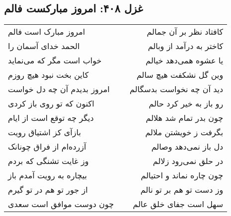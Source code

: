 \begin{center}
\section*{غزل ۴۰۸: امروز مبارکست فالم}
\label{sec:408}
\begin{longtable}{l p{0.5cm} r}
امروز مبارک است فالم
&&
کافتاد نظر بر آن جمالم
\\
الحمد خدای آسمان را
&&
کاختر به درآمد از وبالم
\\
خواب است مگر که می‌نماید
&&
یا عشوه همی‌دهد خیالم
\\
کاین بخت نبود هیچ روزم
&&
وین گل نشکفت هیچ سالم
\\
امروز بدیدم آن چه دل خواست
&&
دید آن چه نخواست بدسگالم
\\
اکنون که تو روی باز کردی
&&
رو باز به خیر کرد حالم
\\
دیگر چه توقع است از ایام
&&
چون بدر تمام شد هلالم
\\
بازآی کز اشتیاق رویت
&&
بگرفت ز خویشتن ملالم
\\
آزرده‌ام از فراق چونانک
&&
دل باز نمی‌دهد وصالم
\\
وز غایت تشنگی که بردم
&&
در حلق نمی‌رود زلالم
\\
بیچاره به رویت آمدم باز
&&
چون چاره نماند و احتیالم
\\
از جور تو هم در تو گیرم
&&
وز دست تو هم بر تو نالم
\\
چون دوست موافق است سعدی
&&
سهل است جفای خلق عالم
\\
\end{longtable}
\end{center}
